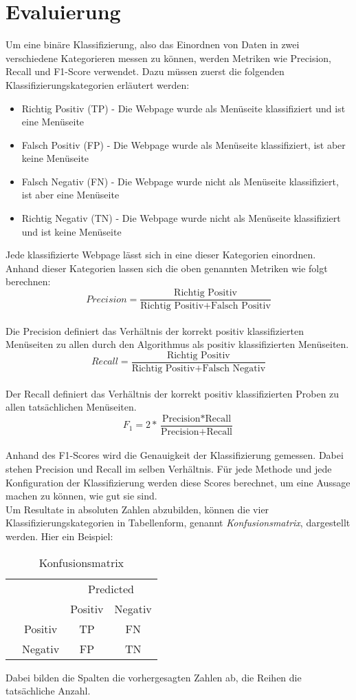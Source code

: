 \section{Evaluierung}
Um eine binäre Klassifizierung, also das Einordnen von Daten in zwei verschiedene Kategorieren messen zu können, werden Metriken wie Precision, Recall und F1-Score verwendet.
Dazu müssen zuerst die folgenden Klassifizierungskategorien erläutert werden:
\begin{itemize}
	\item Richtig Positiv (TP) - Die Webpage wurde als Menüseite klassifiziert und ist eine Menüseite
	\item Falsch Positiv (FP) - Die Webpage wurde als Menüseite klassifiziert, ist aber keine Menüseite
	\item Falsch Negativ (FN) - Die Webpage wurde nicht als Menüseite klassifiziert, ist aber eine Menüseite
	\item Richtig Negativ (TN) - Die Webpage wurde nicht als Menüseite klassifiziert und ist keine Menüseite
\end{itemize}
Jede klassifizierte Webpage lässt sich in eine dieser Kategorien einordnen.
Anhand dieser Kategorien lassen sich die oben genannten Metriken wie folgt berechnen:\\
\[Precision=\frac{\text{Richtig Positiv}}{\text{Richtig Positiv} + \text{Falsch Positiv}}\]\\
Die Precision definiert das Verhältnis der korrekt positiv klassifizierten Menüseiten zu allen durch den Algorithmus als positiv klassifizierten Menüseiten.\\
\[Recall=\frac{\text{Richtig Positiv}}{\text{Richtig Positiv} + \text{Falsch Negativ}}\]\\
Der Recall definiert das Verhältnis der korrekt positiv klassifizierten Proben zu allen tatsächlichen Menüseiten.\\
\[F_{1}=2*\frac{\text{Precision} * \text{Recall}}{\text{Precision} + \text{Recall}}\]\\
Anhand des F1-Scores wird die Genauigkeit der Klassifizierung gemessen.
Dabei stehen Precision und Recall im selben Verhältnis.
Für jede Methode und jede Konfiguration der Klassifizierung werden diese Scores berechnet, um eine Aussage machen zu können, wie gut sie sind.\\
Um Resultate in absoluten Zahlen abzubilden, können die vier Klassifizierungskategorien in Tabellenform, genannt \emph{Konfusionsmatrix}, dargestellt werden.
Hier ein Beispiel:
\begin{table}[H]
	\centering
	\begin{tabular}{@{}cc|cc@{}}
		\multicolumn{1}{c}{} &\multicolumn{1}{c}{} &\multicolumn{2}{c}{Predicted} \\ 
		\multicolumn{1}{c}{} & 
		\multicolumn{1}{c|}{} & 
		\multicolumn{1}{c}{Positiv} & 
		\multicolumn{1}{c}{Negativ} \\ 
		\cline{2-4}
		\multirow[c]{2}{*}{\rotatebox[origin=tr]{90}{Actual}}
		& Positiv  & TP   & FN   \\[1.5ex]
		& Negativ  & FP   & TN \\ 
		\cline{2-4}
	\end{tabular}
	\caption{Konfusionsmatrix}
\end{table}
Dabei bilden die Spalten die vorhergesagten Zahlen ab, die Reihen die tatsächliche Anzahl.
